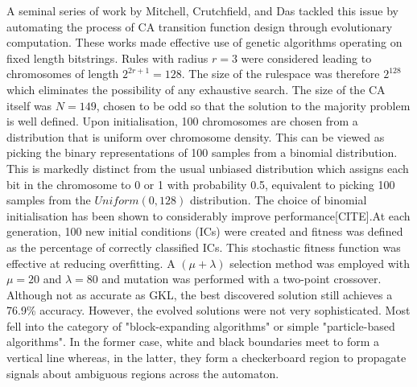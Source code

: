 A seminal series of work by Mitchell, Crutchfield, and Das\cite{mitchell1996evolving} tackled this issue by automating the process of CA transition function design through evolutionary computation. These works made effective use of genetic algorithms operating on fixed length bitstrings. Rules with radius $r = 3$ were considered leading to chromosomes of length $2^{2r+1}=128$. The size of the rulespace was therefore $2^{128}$ which eliminates the possibility of any exhaustive search. The size of the CA itself was $N=149$, chosen to be odd so that the solution to the majority problem is well defined. Upon initialisation, 100 chromosomes are chosen from a distribution that is uniform over chromosome density. This can be viewed as picking the binary representations of 100 samples from a binomial distribution. This is markedly distinct from the usual unbiased distribution which assigns each bit in the chromosome to 0 or 1 with probability 0.5, equivalent to picking 100 samples from the $Uniform(0, 128)$ distribution. The choice of binomial initialisation has been shown to considerably improve performance[CITE].At each generation, 100 new initial conditions (ICs) were created and fitness was defined as the percentage of correctly classified ICs. This stochastic fitness function was effective at reducing overfitting. A $(\mu+\lambda)$ selection method was employed with $\mu=20$ and $\lambda=80$ and mutation was performed with a two-point crossover. Although not as accurate as GKL, the best discovered solution still achieves a 76.9\% accuracy. However, the evolved solutions were not very sophisticated. Most fell into the category of "block-expanding algorithms" or simple "particle-based algorithms". In the former case, white and black boundaries meet to form a vertical line whereas, in the latter, they form a checkerboard region to propagate signals about ambiguous regions across the automaton.\\

